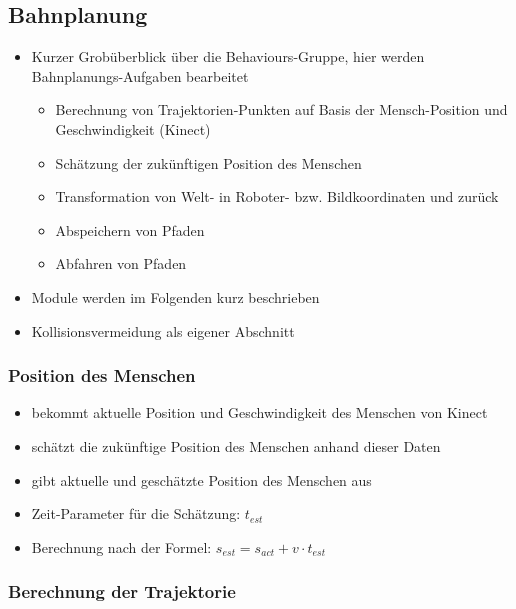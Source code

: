 \subsection{Bahnplanung}
\label{bahnplanung_subsec}
\authorsection{\editortobias}


\begin{itemize}
	\item Kurzer Grobüberblick über die Behaviours-Gruppe, hier werden Bahnplanungs-Aufgaben bearbeitet
	\begin{itemize}
		\item Berechnung von Trajektorien-Punkten auf Basis der Mensch-Position und Geschwindigkeit (Kinect)
		\item Schätzung der zukünftigen Position des Menschen
		\item Transformation von Welt- in Roboter- bzw. Bildkoordinaten und zurück
		\item Abspeichern von Pfaden
		\item Abfahren von Pfaden
	\end{itemize}
	\item Module werden im Folgenden kurz beschrieben
	\item Kollisionsvermeidung als eigener Abschnitt
\end{itemize}



\subsubsection{Position des Menschen}

\begin{itemize}
    \item bekommt aktuelle Position und Geschwindigkeit des Menschen von Kinect
    \item schätzt die zukünftige Position des Menschen anhand dieser Daten
    \item gibt aktuelle und geschätzte Position des Menschen aus
    \item Zeit-Parameter für die Schätzung: $t_{est}$
    \item Berechnung nach der Formel: $s_{est} = s_{act} + v \cdot t_{est}$
\end{itemize}


\subsubsection{Berechnung der Trajektorie}


